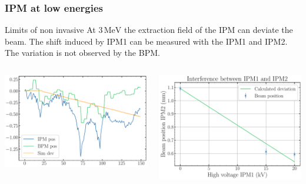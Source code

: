 \begin{frame}[t]
  \frametitle{IPM at low energies}
  \begin{block}{Limits of non invasive}
    At $3\,\mathrm{MeV}$ the extraction field of the IPM can deviate the beam.
    The shift induced by IPM1 can be measured with the IPM1 and IPM2. The variation is not observed by the BPM.
  \end{block}
  \begin{columns}[T]
    \begin{column}{0.45\textwidth}
      \includegraphics[width=1\textwidth]{06_Backup/fig/fig000_dev_IPM_BPM}
    \end{column}
    \begin{column}{0.45\textwidth}
      \includegraphics[width=1\textwidth]{06_Backup/fig/fig000_cross_position}
    \end{column}
  \end{columns}
\end{frame}

